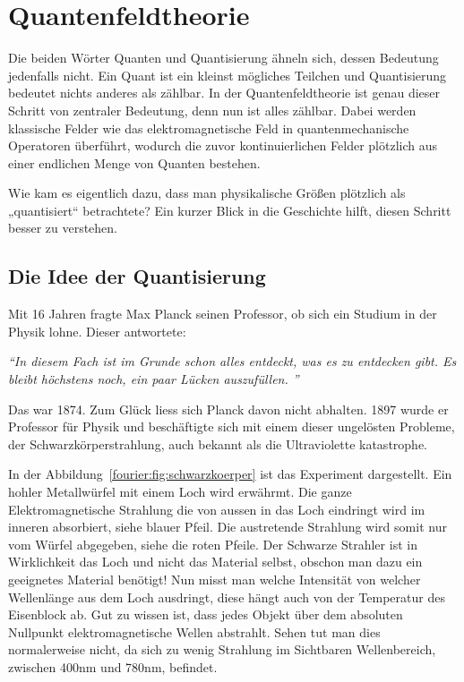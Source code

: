 %
%
%
%
\section{Quantenfeldtheorie\label{fourier:section:quantenfeldtheorie}}
Die beiden Wörter Quanten und Quantisierung ähneln sich, dessen Bedeutung jedenfalls nicht. 
Ein Quant ist ein kleinst mögliches Teilchen und Quantisierung bedeutet nichts anderes als zählbar. 
In der Quantenfeldtheorie ist genau dieser Schritt von zentraler Bedeutung, denn nun ist alles zählbar. 
Dabei werden klassische Felder wie das elektromagnetische Feld in quantenmechanische Operatoren überführt, wodurch die zuvor kontinuierlichen Felder plötzlich aus einer endlichen Menge von Quanten bestehen.

Wie kam es eigentlich dazu, dass man physikalische Größen plötzlich als „quantisiert“ betrachtete?  
Ein kurzer Blick in die Geschichte hilft, diesen Schritt besser zu verstehen.

\subsection{Die Idee der Quantisierung\label{fourier:subsection:DieIdeeDerQuantisierung}}
	Mit 16 Jahren fragte Max Planck seinen Professor, ob sich ein Studium in der Physik lohne. 
	Dieser antwortete:
	
	\begin{center}
		\textit{``{}In diesem Fach ist im Grunde schon alles entdeckt, was es zu entdecken gibt.
		Es bleibt höchstens noch, ein paar Lücken auszufüllen. ''}
	\end{center}
	
	Das war 1874.
	Zum Glück liess sich Planck davon nicht abhalten.
	1897 wurde er Professor für Physik und beschäftigte sich mit einem dieser ungelösten Probleme, der Schwarzkörperstrahlung, auch bekannt als die Ultraviolette katastrophe. 
	
	
	In der Abbildung~\ref{fourier:fig:schwarzkoerper} ist das Experiment dargestellt. Ein hohler Metallwürfel mit einem Loch wird erwährmt. Die ganze Elektromagnetische Strahlung die von aussen in das Loch eindringt wird im inneren absorbiert, siehe blauer Pfeil. Die austretende Strahlung wird somit nur vom Würfel abgegeben, siehe die roten Pfeile. Der Schwarze Strahler ist in Wirklichkeit das Loch und nicht das Material selbst, obschon man dazu ein geeignetes Material benötigt! Nun misst man welche Intensität von welcher Wellenlänge aus dem Loch ausdringt, diese hängt auch von der Temperatur des Eisenblock ab. 
	Gut zu wissen ist, dass jedes Objekt über dem absoluten Nullpunkt elektromagnetische Wellen abstrahlt. 
	Sehen tut man dies normalerweise nicht, da sich zu wenig Strahlung im Sichtbaren Wellenbereich, zwischen 400nm und 780nm,  befindet. 
	

